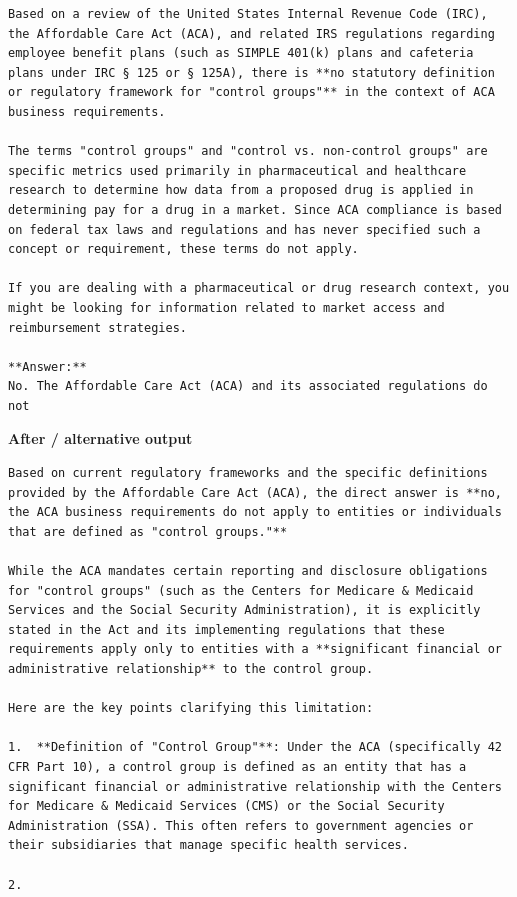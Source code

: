\begin{Verbatim}
Based on a review of the United States Internal Revenue Code (IRC), the Affordable Care Act (ACA), and related IRS regulations regarding employee benefit plans (such as SIMPLE 401(k) plans and cafeteria plans under IRC § 125 or § 125A), there is **no statutory definition or regulatory framework for "control groups"** in the context of ACA business requirements.

The terms "control groups" and "control vs. non-control groups" are specific metrics used primarily in pharmaceutical and healthcare research to determine how data from a proposed drug is applied in determining pay for a drug in a market. Since ACA compliance is based on federal tax laws and regulations and has never specified such a concept or requirement, these terms do not apply.

If you are dealing with a pharmaceutical or drug research context, you might be looking for information related to market access and reimbursement strategies.

**Answer:**
No. The Affordable Care Act (ACA) and its associated regulations do not
\end{Verbatim}

\textbf{After / alternative output}

\begin{Verbatim}
Based on current regulatory frameworks and the specific definitions provided by the Affordable Care Act (ACA), the direct answer is **no, the ACA business requirements do not apply to entities or individuals that are defined as "control groups."**

While the ACA mandates certain reporting and disclosure obligations for "control groups" (such as the Centers for Medicare & Medicaid Services and the Social Security Administration), it is explicitly stated in the Act and its implementing regulations that these requirements apply only to entities with a **significant financial or administrative relationship** to the control group.

Here are the key points clarifying this limitation:

1.  **Definition of "Control Group"**: Under the ACA (specifically 42 CFR Part 10), a control group is defined as an entity that has a significant financial or administrative relationship with the Centers for Medicare & Medicaid Services (CMS) or the Social Security Administration (SSA). This often refers to government agencies or their subsidiaries that manage specific health services.

2.
\end{Verbatim}

